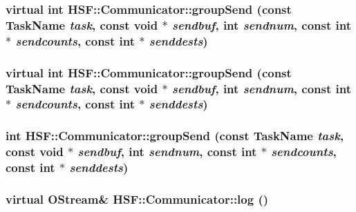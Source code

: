 \label{classHSF_1_1Communicator_a227d4526e8392d941a5ab1b8ead22ded}
\hypertarget{classHSF_1_1Communicator_ade12846093265c30681b1c8e79766ce2}{
\subsubsection[{groupSend}]{\setlength{\rightskip}{0pt plus 5cm}virtual int HSF::Communicator::groupSend (const {\bf TaskName} {\em task}, \/  const void $\ast$ {\em sendbuf}, \/  int {\em sendnum}, \/  const int $\ast$ {\em sendcounts}, \/  const int $\ast$ {\em senddests})}}
\label{classHSF_1_1Communicator_ade12846093265c30681b1c8e79766ce2}
\hypertarget{classHSF_1_1Communicator_ade12846093265c30681b1c8e79766ce2}{
\subsubsection[{groupSend}]{\setlength{\rightskip}{0pt plus 5cm}virtual int HSF::Communicator::groupSend (const {\bf TaskName} {\em task}, \/  const void $\ast$ {\em sendbuf}, \/  int {\em sendnum}, \/  const int $\ast$ {\em sendcounts}, \/  const int $\ast$ {\em senddests})}}
\label{classHSF_1_1Communicator_ade12846093265c30681b1c8e79766ce2}
\hypertarget{classHSF_1_1Communicator_a9fd860c63129153fd3951050b6f89c5b}{
\subsubsection[{groupSend}]{\setlength{\rightskip}{0pt plus 5cm}int HSF::Communicator::groupSend (const {\bf TaskName} {\em task}, \/  const void $\ast$ {\em sendbuf}, \/  int {\em sendnum}, \/  const int $\ast$ {\em sendcounts}, \/  const int $\ast$ {\em senddests})}}
\label{classHSF_1_1Communicator_a9fd860c63129153fd3951050b6f89c5b}
\hypertarget{classHSF_1_1Communicator_a80806fd26dfa925ef6fb55cee2cb74f5}{
\subsubsection[{log}]{\setlength{\rightskip}{0pt plus 5cm}virtual {\bf OStream}\& HSF::Communicator::log ()}}
\label{classHSF_1_1Communicator_a80806fd26dfa925ef6fb55cee2cb74f5}


